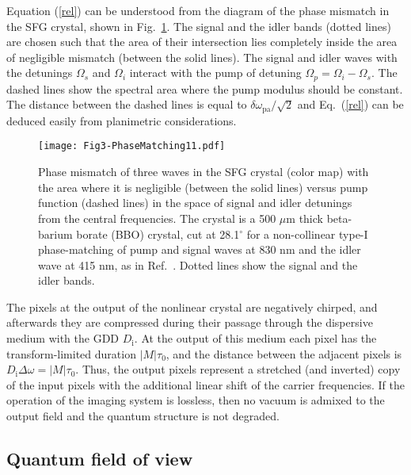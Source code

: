 \documentclass[10pt,twocolumn]{article}
\begin{document}
Equation (\ref{rel}) can be understood from the diagram of the phase mismatch in the SFG crystal, shown in Fig.~\ref{fig:PM+pump}. The signal and the idler bands (dotted lines) are chosen such that the area of their intersection lies completely inside the area of negligible mismatch (between the solid lines). The signal and idler waves with the detunings $\Omega_s$ and $\Omega_i$ interact with the pump of detuning $\Omega_p=\Omega_i-\Omega_s$. The dashed lines show the spectral area where the pump modulus should be constant. The distance between the dashed lines is equal to $\delta\omega_{\mathrm{pa}}/\sqrt{2}$ and Eq.~(\ref{rel}) can be deduced easily from planimetric considerations.

\begin{figure}[t!]
\centering
\texttt{[image: Fig3-PhaseMatching11.pdf]}
\caption{Phase mismatch of three waves in the SFG crystal (color map) with the area where it is negligible (between the solid lines) versus pump function (dashed lines) in the space of
signal and idler detunings from the central frequencies. The crystal is a 500 $\mu$m thick beta-barium borate (BBO) crystal, cut at 28.1$^{\circ}$ for a non-collinear type-I phase-matching of pump and signal waves at 830 nm and the idler wave at 415 nm, as in Ref.~\cite{Bennett2001}. Dotted lines show the signal and the idler bands. }
\label{fig:PM+pump}
\end{figure}

The pixels at the output of the nonlinear crystal are negatively chirped, and afterwards they are compressed during their passage through the dispersive medium with the GDD $D_{\mathrm{i}}$. At the output of this medium each pixel has the transform-limited duration $|M|\tau_0$, and the distance between the adjacent pixels is $ D_{\mathrm{i}}\Delta\omega=|M|\tau_0$. Thus, the output pixels represent a stretched (and inverted) copy of the input pixels with the additional linear shift of the carrier frequencies. If the operation of the imaging system is lossless, then no vacuum is admixed to the output field and the quantum structure is not degraded.


\subsection{Quantum field of view}
\end{document}
